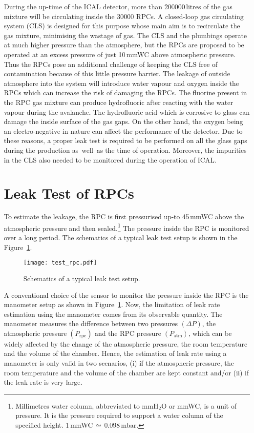 During the up-time of the ICAL detector, more than 200000\,litres of
the gas mixture will be circulating inside the 30000 RPCs.
A closed-loop gas circulating system (CLS) is designed for this
purpose whose main aim is to recirculate the gas mixture, minimising
the wastage of gas.
The CLS and the plumbings operate at much higher pressure than the
atmosphere, but the RPCs are proposed to be operated at an excess
pressure of just 10\,mmWC above atmospheric pressure. Thus the RPCs
pose an additional challenge of keeping the CLS free of contamination
because of this little pressure barrier.
The leakage of outside atmosphere into the
system will introduce water vapour and oxygen inside the RPCs which
can increase the risk of damaging the RPCs\cite{rpc_c,rpc_w}.
The fluorine present in the RPC gas mixture can produce hydrofluoric
after reacting with the water vapour during the avalanche.
The hydrofluoric acid which is corrosive to glass can damage the
inside surface of the gas gaps. On the other hand, the oxygen being
an electro-negative in nature can affect the performance of the
detector. Due to these reasons, a proper leak test is required to be
performed on all the glass gaps during the production as~well~as the
time of operation. Moreover, the impurities in the
CLS also needed to be monitored during the operation of ICAL.

\section{Leak Test of RPCs}
To estimate the leakage, the RPC is first pressurised up-to 45\,mmWC
above the atmospheric pressure and then sealed.\footnote{Millimetres
  water column, abbreviated to mmH$_2$O or mmWC, is a unit of pressure.
  It is the pressure required to support a water column of the
  specified height. 1\,mmWC\,$\simeq$\,0.098\,mbar.}
The pressure inside the RPC is monitored over a long period.
The schematics of a typical leak test setup is shown in the
Figure~\ref{fig:test_rpc}. 
\begin{figure}
  \centering
  \texttt{[image: test\_rpc.pdf]}
  \caption{Schematics of a typical leak test setup.}
  \label{fig:test_rpc}
\end{figure}
A conventional choice of the sensor to monitor the pressure inside
the RPC is the manometer setup as shown in Figure~\ref{fig:test_rpc}.
Now, the limitation of leak rate estimation using the manometer comes
from its observable quantity. The manometer measures the difference
between two pressures $\left(\Delta P\right)$, the atmospheric
pressure $\left(P_{\mathrm{rpc}}\right)$ and the RPC pressure
$\left(P_{\mathrm{atm}}\right)$, which can be widely affected by the
change of the atmospheric pressure, the room temperature and the
volume of the chamber. Hence, the estimation of leak rate using a
manometer is only valid in two scenarios, (i) if the atmospheric
pressure, the room temperature and the volume of the chamber are
kept constant and/or (ii) if the leak rate is very large.

